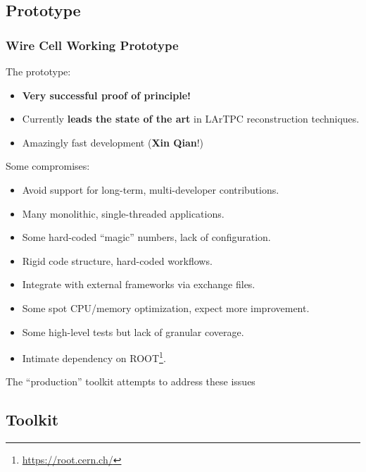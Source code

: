 \documentclass[xcolor=dvipsnames]{beamer}
\begin{document}
\subsection{Prototype}

\begin{frame}
  \frametitle{Wire Cell Working Prototype}
  \footnotesize
  The prototype:
  \begin{itemize}
  \item \textbf{Very successful proof of principle!}
  \item Currently \textbf{leads the state of the art} in LArTPC
    reconstruction techniques.
  \item Amazingly fast development (\textbf{Xin Qian}!)
  \end{itemize}
  Some compromises:
  \begin{itemize}
  \item Avoid support for long-term, multi-developer contributions.
  \item Many monolithic, single-threaded applications.
  \item Some hard-coded ``magic'' numbers, lack of configuration.
  \item Rigid code structure, hard-coded workflows.
  \item Integrate with external frameworks via exchange files.
  \item Some spot CPU/memory optimization, expect more improvement.
  \item Some high-level tests but lack of granular coverage.
  \item Intimate dependency on ROOT\footnote{\url{https://root.cern.ch/}}.
  \end{itemize}
  
  The ``production'' toolkit attempts to address these issues
\end{frame}

\subsection{Toolkit}
\end{document}
